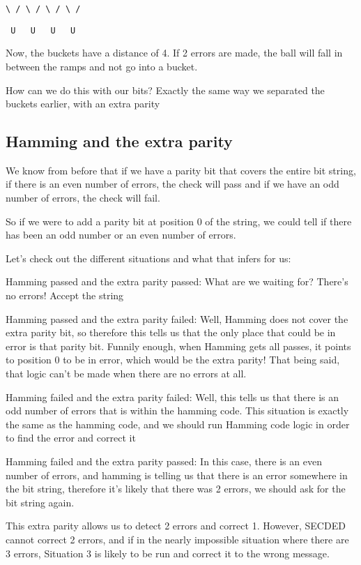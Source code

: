 \documentclass{article}
\begin{document}
    \texttt{\textbackslash\ /\ \textbackslash\ /\ \textbackslash\ /\ \textbackslash\ /}

    \texttt{\ U\ \ \ U\ \ \ U\ \ \ U}

   Now, the buckets have a distance of 4. If 2 errors are made, the ball will fall in between the ramps and not go into a bucket.

   How can we do this with our bits? Exactly the same way we separated the buckets earlier, with an extra parity

   \subsection*{Hamming and the extra parity}
   
   We know from before that if we have a parity bit that covers the entire bit string, if there is an even number of errors, the check will pass and if we have an odd number of errors, the check will fail.

   So if we were to add a parity bit at position 0 of the string, we could tell if there has been an odd number or an even number of errors.

   Let's check out the different situations and what that infers for us:

   Hamming passed and the extra parity passed: What are we waiting for? There's no errors! Accept the string

   Hamming passed and the extra parity failed: Well, Hamming does not cover the extra parity bit, so therefore this tells us that the only place that could be in error is that parity bit. Funnily enough, when Hamming gets all passes, it points to position 0 to be in error, which would be the extra parity! That being said, that logic can't be made when there are no errors at all.

   Hamming failed and the extra parity failed: Well, this tells us that there is an odd number of errors that is within the hamming code. This situation is exactly the same as the hamming code, and we should run Hamming code logic in order to find the error and correct it

   Hamming failed and the extra parity passed: In this case, there is an even number of errors, and hamming is telling us that there is an error somewhere in the bit string, therefore it's likely that there was 2 errors, we should ask for the bit string again.

   This extra parity allows us to detect 2 errors and correct 1. However, SECDED cannot correct 2 errors, and if in the nearly impossible situation where there are 3 errors, Situation 3 is likely to be run and correct it to the wrong message.
\end{document}

